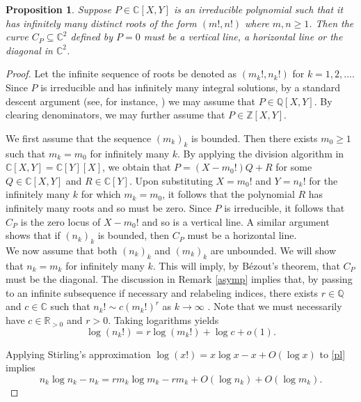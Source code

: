 \documentclass[11pt,reqno]{amsart}
\newtheorem{proposition}[theorem]{Proposition}
\theoremstyle{definition}
\numberwithin{equation}{section}
\newcommand{\Z}{\mathbb{Z}}
\newcommand{\R}{\mathbb{R}}
\newcommand{\Q}{\mathbb{Q}}
\begin{document}
  

\begin{proposition} \label{factorials}
Suppose $P \in \mathbb C[X, Y]$ is an irreducible polynomial such that it has infinitely many distinct roots of the form $(m!, n!)$ where $m, n \geqslant 1$. Then the curve $C_P \subseteq \mathbb C^2$ defined by $P=0$ must be a vertical line, a horizontal line or the diagonal in $\mathbb C^2$. 
\end{proposition}

\begin{proof}
Let the infinite sequence of roots be denoted as $(m_k!, n_k!)$ for $k=1, 2, \ldots$. Since $P$ is irreducible and has infinitely many integral solutions, by a standard descent argument (see, for instance, \cite[page 230]{Lan65}) we may assume that $P \in \Q[X, Y]$.  By clearing denominators, we may further assume that $P \in \Z[X, Y]$. 


We first assume that the sequence $(m_k)_k$ is bounded. 
Then there exists $m_0 \geqslant 1$ such that $m_k=m_0$ for infinitely many $k$. By applying the division algorithm in $\mathbb C[X, Y]=\mathbb C[Y][X]$, we obtain that $P=(X-m_0!)Q+R$ for some $Q \in \mathbb C[X, Y]$ and $R \in \mathbb C[Y]$. Upon substituting $X=m_0!$ and $Y=n_k!$ for the infinitely many $k$ for which $m_k=m_0$, it follows that the polynomial $R$ has infinitely many roots and so must be zero. Since $P$ is irreducible, it follows that $C_P$ is the zero locus of $X-m_0!$ and so is a vertical line. A similar argument shows that if $(n_k)_k$ is bounded, then $C_P$ must be a horizontal line. 
\\
We now assume that both $(n_k)_k$ and $(m_k)_k$ are unbounded.  We will show that $n_k=m_k$ for infinitely many $k$. This will imply, by Bézout's theorem, that $C_P$ must be the diagonal. The discussion in Remark \ref{asymp} implies that, by passing to an infinite subsequence if necessary and relabeling indices,  there exists $r \in \Q$ and $c \in \mathbb C$ such that $n_k! \sim c (m_k!)^r$ as $k \to \infty$ . Note that we must necessarily have $c \in \R_{>0}$ and $r>0$.   %
Taking logarithms yields 
\begin{equation} \label{pl}
\log(n_k!)= r \log(m_k!)+ \log c+o(1). 
\end{equation}


Applying Stirling's approximation  $\log(x!)=x \log x-x+O(\log x)$ to  \eqref{pl} implies
\begin{equation} \label{pl2}
n_k \log n_k - n_k = r m_k \log m_k - rm_k +O(\log n_k) +O(\log m_k). 
\end{equation}



\end{proof}
\end{document}
